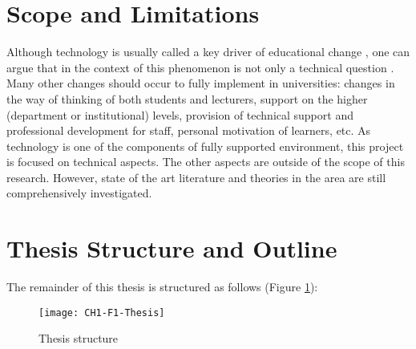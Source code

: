 \section{Scope and Limitations}

Although technology is usually called a key driver of educational change
\citep{Attwell2007}, one can argue that in the context of \LLLs this phenomenon
is not only a technical question \citep{Schaffert2008}. Many other changes
should occur to fully implement \LLLs in universities: changes in the way of
thinking of both students and lecturers, support on the higher (department or
institutional) levels, provision of technical support and professional
development for staff, personal motivation of learners, etc. As technology is
one of the components of fully supported \LLLs environment, this project is
focused on technical aspects. The other aspects are outside of the scope of
this research. However, state of the art literature and theories in the area
are still comprehensively investigated.

\section{Thesis Structure and Outline}

The remainder of this thesis is structured as follows (Figure \ref{fig:ts}):

\begin{figure}[htb]
\centering
\texttt{[image: CH1-F1-Thesis]}
\caption{Thesis structure}
\label{fig:ts}
\end{figure}

